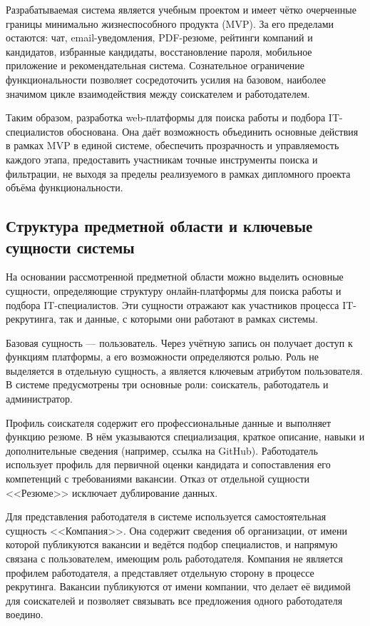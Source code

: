Разрабатываемая система является учебным проектом и имеет чётко очерченные границы минимально жизнеспособного продукта (MVP). За его пределами остаются: чат, email-уведомления, PDF-резюме, рейтинги компаний и кандидатов, избранные кандидаты, восстановление пароля, мобильное приложение и рекомендательная система. Сознательное ограничение функциональности позволяет сосредоточить усилия на базовом, наиболее значимом цикле взаимодействия между соискателем и работодателем.

Таким образом, разработка web-платформы для поиска работы и подбора IT-специалистов обоснована. Она даёт возможность объединить основные действия в рамках MVP в единой системе, обеспечить прозрачность и управляемость каждого этапа, предоставить участникам точные инструменты поиска и фильтрации, не выходя за пределы реализуемого в рамках дипломного проекта объёма функциональности.

\subsection{Структура предметной области и ключевые сущности системы}

На основании рассмотренной предметной области можно выделить основные сущности, определяющие структуру онлайн-платформы для поиска работы и подбора IT-специалистов. Эти сущности отражают как участников процесса IT-рекрутинга, так и данные, с которыми они работают в рамках системы.

Базовая сущность --- пользователь. Через учётную запись он получает доступ к функциям платформы, а его возможности определяются ролью. Роль не выделяется в отдельную сущность, а является ключевым атрибутом пользователя. В системе предусмотрены три основные роли: соискатель, работодатель и администратор.

Профиль соискателя содержит его профессиональные данные и выполняет функцию резюме. В нём указываются специализация, краткое описание, навыки и дополнительные сведения (например, ссылка на GitHub). Работодатель использует профиль для первичной оценки кандидата и сопоставления его компетенций с требованиями вакансии. Отказ от отдельной сущности <<Резюме>> исключает дублирование данных.

Для представления работодателя в системе используется самостоятельная сущность <<Компания>>. Она содержит сведения об организации, от имени которой публикуются вакансии и ведётся подбор специалистов, и напрямую связана с пользователем, имеющим роль работодателя. Компания не является профилем работодателя, а представляет отдельную сторону в процессе рекрутинга. Вакансии публикуются от имени компании, что делает её видимой для соискателей и позволяет связывать все предложения одного работодателя воедино.

